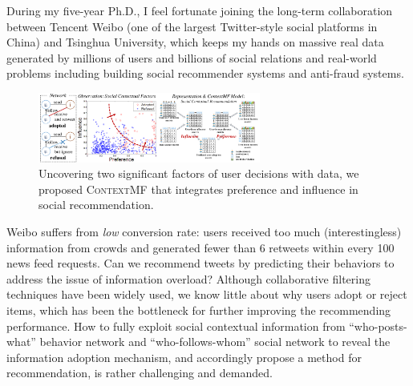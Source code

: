 \documentclass[10.5pt]{article}
\begin{document}
\vskip 0.05in
\vskip 0.01in

During my five-year Ph.D., I feel fortunate joining the long-term collaboration between Tencent Weibo (one of the largest Twitter-style social platforms in China) and Tsinghua University, which keeps my hands on massive real data generated by millions of users and billions of social relations and real-world problems including building social recommender systems and anti-fraud systems. 

\vskip 0.03in


\begin{figure}
\vskip -0.12in
\includegraphics[width=0.65\textwidth]{figure/contextmf.pdf}
\vskip -0.18in
\caption{Uncovering two significant factors of user decisions with data, we proposed \textsc{ContextMF} \cite{jiang2012socialcontextual} that integrates preference and influence in social recommendation.}
\label{fig:contextmf}
\vskip -0.12in
\end{figure}

Weibo suffers from \textit{low} conversion rate: users received too much (interestingless) information from crowds and generated fewer than 6 retweets within every 100 news feed requests. Can we recommend tweets by predicting their behaviors to address the issue of information overload? Although collaborative filtering techniques have been widely used, we know little about why users adopt or reject items, which has been the bottleneck for further improving the recommending performance. How to fully exploit social contextual information from ``who-posts-what'' behavior network and ``who-follows-whom'' social network to reveal the information adoption mechanism, and accordingly propose a method for recommendation, is rather challenging and demanded.
\end{document}
